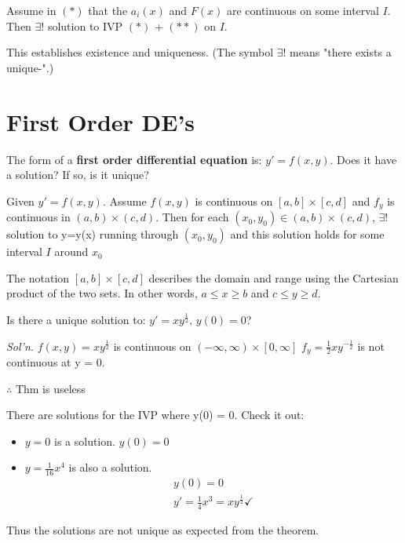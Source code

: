 \documentclass[../main.tex]{subfiles}
\begin{document}
\begin{theorem}[]
    Assume in \( (*) \) that the \(a_{i}(x) \) and \( F(x) \) are continuous on some interval \( I
     \).
    Then \( \exists ! \) solution to IVP \( (*) \) + \( (**) \) on \( I \).

    \begin{note}
        This establishes existence and uniqueness. (The symbol \( \exists ! \) means "there exists a unique-".)
    \end{note}
\end{theorem}


\section{First Order DE's}

The form of a \textbf{first order differential equation} is: \( y' = f(x,y) \). Does it have a solution? If so, is it unique?

\begin{theorem}[]
    Given \( y'=f(x,y) \). Assume \( f(x,y) \) is continuous on \( [a,b] \times [c,d] \) and \( f_{y} \) is continuous in \( (a,b) \times (c,d) \).
    Then for each \( (x_0,y_0) \in (a,b) \times (c,d),\, \exists ! \) solution to y=y(x) running through \( (x_0,y_0) \) and this solution holds for some interval \( I \) around \( x_0 \)
    
    \begin{note}
        The notation \( [a,b] \times [c,d] \) describes the domain and range using the Cartesian product of the two sets. In other words, \(a \leq x \geq b \) and \( c \leq y \geq d \).
    \end{note}
\end{theorem}

\begin{example}[]
    Is there a unique solution to: \( y'=xy^{\frac{1}{2}},\,y(0)=0 \)?

    \textit{Sol'n.}
    \( f(x,y)=xy^{\frac{1}{2}} \) is continuous on \( (-\infty,\infty)\times[0,\infty] \)
    \( f_y = \frac{1}{2}xy^{-\frac{1}{2}} \) is not continuous at y = 0.
    
    \( \therefore \) Thm is useless

    There are solutions for the IVP where y(0) = 0. Check it out:
    \begin{itemize}[mode=unboxed]
        \item \( y=0 \) is a solution. \( y(0) = 0 \)
        \item \( y=\frac{1}{16}x^4 \) is also a solution.
            \begin{gather*}
                y(0) = 0 \\
                y'=\frac{1}{4}x^3=xy^{\frac{1}{2}} \checkmark
            \end{gather*}
    \end{itemize}
    Thus the solutions are not unique as expected from the theorem.
\end{example}
\end{document}
